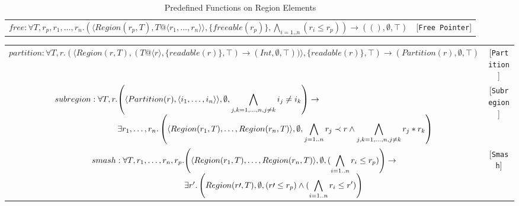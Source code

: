 \documentclass{article}
\newcommand{\rtriple}[3]{\left({#1},{#2},{#3}\right)}
\newcommand{\rsingle}[1]{\rtriple{#1}{\emptyset}{\top}}
\begin{document}
\begin{table*}
{\begin{tabular}{cc}
%
%
\begin{math}
free : \forall T,r_p,r_1,\ldots,r_n. \rtriple{\langle Region(r_p,T), T@\langle r_1, \ldots, r_n \rangle { } \rangle}{\{ freeable(r_p) \}}{\displaystyle\bigwedge_{i = 1..n} (r_i \le r_p)} \rightarrow \rsingle{()}
\end{math} & [{\tt Free Pointer}]
\end{tabular}
}
\caption{Predefined Functions on Region Elements}
\end{table*}

\begin{table*}
\centering
{\small
\begin{tabular}{cc}

%
%
\begin{math}
partition : \forall T,r. \rtriple{\langle Region(r,T), \rtriple{T@\langle r \rangle}{\{ readable(r) \}}{\top} \rightarrow \rsingle{\mathit{Int}}) \rangle}{\{readable(r)\}}{\top} \rightarrow \rsingle{Partition(r)}
\end{math} & [{\tt Partition}] \\

%
%
\begin{math}
\begin{array}{lc}
\begin{array}{l@{}l}
subregion : \forall T,r. & \rtriple{\langle Partition(r), \langle i_1, \ldots, i_n \rangle \rangle}{\emptyset}{\displaystyle\bigwedge_{j,k = 1, \ldots, n, j \ne k} i_j \ne i_k}
\rightarrow \\
& \exists r_1, \ldots, r_n. \rtriple{\langle Region(r_1,T), \ldots, Region(r_n,T) \rangle}{\emptyset}{\displaystyle\bigwedge_{j = 1..n} r_j \prec r \wedge \displaystyle\bigwedge_{j,k = 1, \ldots, n, j \ne k} r_j * r_k}
\end{array}
\end{array}
\end{math} & [{\tt Subregion}] \\

%
%
\begin{math}
\begin{array}{l@{}l}
smash : \forall T,r_1,\ldots,r_n,r_p. & \rtriple{\langle Region(r_1,T), \ldots, Region(r_n,T) \rangle}{\emptyset}{(\displaystyle\bigwedge_{i = 1.. n} r_i \le r_p)} \rightarrow \\
& \exists r'.  \rtriple{Region(r\prime,T)}{\emptyset}{(r\prime \le r_p) \wedge (\displaystyle\bigwedge_{i = 1..n} r_i \le r')}
\end{array}
\end{math} & [{\tt Smash}] \\


\end{tabular}}
\end{table*}
\end{document}
